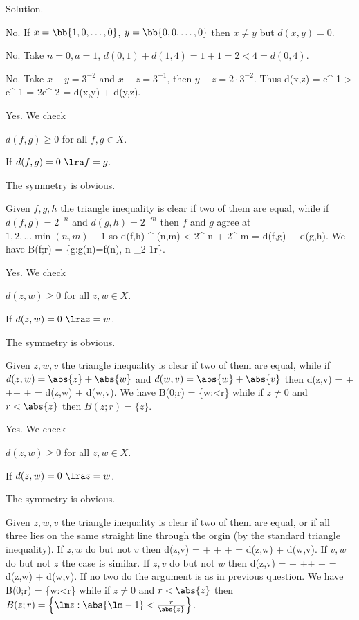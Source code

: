 Solution. \ben
\item [(i)] No. If $x=\bb{1,0,\dots,0}$, $y=\bb{0,0,\dots,0}$ then $x\neq y$ but $d(x,y) = 0$.
\item [(ii)] No. Take $n=0,a=1$, $d(0,1) + d(1,4) = 1 + 1 = 2 < 4 = d(0,4)$.
\item [(iii)] No. Take $x-y = 3^{-2}$ and $x-z = 3^{-1}$, then $y-z = 2\cdot 3^{-2}$. Thus
\be
d(x,z) = e^{-1} > e^{-1}  = 2e^{-2} = d(x,y) + d(y,z).
\ee
\item [(iv)] Yes. We check
\ben
\item [(a)] $d(f,g)\geq 0$ for all $f,g\in X$. 
\item [(b)] If $d(f,g)=0\ \lra f=g$.
\item [(c)] The symmetry is obvious.
\item [(d)] Given $f,g,h$ the triangle inequality is clear if two of them are equal, while if $d(f,g) = 2^{-n}$ and $d(g,h) = 2^{-m}$ then $f$ and $g$ agree at $1,2,\dots \min(n,m)-1$ so 
\be
d(f,h) ^{-\min(n,m)} < 2^{-n} + 2^{-m} = d(f,g) + d(g,h).
\ee
\een
We have 
\be
B(f;r) = \{g:g(n)=f(n), \forall n \leq \log_2 \tfrac 1r\}.
\ee
\item [(v)] Yes. We check \ben
\item [(a)] $d(z,w)\geq 0$ for all $z,w\in X$. 
\item [(b)] If $d(z,w)=0\ \lra z=w$.
\item [(c)] The symmetry is obvious.
\item [(d)] Given $z,w,v$ the triangle inequality is clear if two of them are equal, while if $d(z,w) = \abs{z}+\abs{w}$ and $d(w,v) = \abs{w} + \abs{v}$ then \be
d(z,v) =  +  \leq {}++ +  = d(z,w) + d(w,v).
\ee
\een
We have 
\be
B(0;r) = \{w:<r\}
\ee
while if $z\neq 0$ and $r<\abs{z}$ then $B(z;r) = \{z\}$.
\item [(vi)] Yes. We check
\ben
\item [(a)] $d(z,w)\geq 0$ for all $z,w\in X$. 
\item [(b)] If $d(z,w)=0\ \lra z=w$.
\item [(c)] The symmetry is obvious.
\item [(d)] Given $z,w,v$ the triangle inequality is clear if two of them are equal, or if all three lies on the same straight line through the orgin (by the standard triangle inequality). If $z,w$ do but not $v$ then
\be
d(z,v) =  +  \leq {} + +  = d(z,w) + d(w,v).
\ee
If $v,w$ do but not $z$ the case is similar. If $z,v$ do but not $w$ then
\be
d(z,v) =  \leq {}+ \leq {}++ +  = d(z,w) + d(w,v).
\ee
\een
If no two do the argument is as in previous question. We have 
\be
B(0;r) = \{w:<r\}
\ee
while if $z\neq 0$ and $r<\abs{z}$ then $B(z;r) = \left\{\lm z: \abs{\lm -1} < \frac r{\abs{z}}\right\}$.

